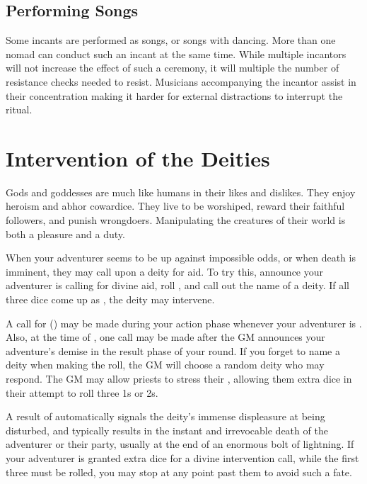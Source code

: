 \begin{multicols}{2}
\subsection{Performing Songs}
Some incants are performed as songs, or songs with dancing. More than one nomad can conduct such an incant at the same time. While multiple incantors will not increase the effect of such a ceremony, it will multiple the number of resistance checks needed to resist. Musicians accompanying the incantor assist in their concentration making it harder for external distractions to interrupt the ritual.

\section{Intervention of the Deities}
Gods and goddesses are much like humans in their likes and dislikes. They enjoy heroism and abhor cowardice. They live to be worshiped, reward their faithful followers, and punish wrongdoers. Manipulating the creatures of their world is both a pleasure and a duty.

When your adventurer seems to be up against impossible odds, or when death is imminent, they may call upon a deity for aid. To try this, announce your adventurer is calling for divine aid, roll , and call out the name of a deity. If all three dice come up as , the deity may intervene.

A call for  (\DI) may be made during your action phase whenever your adventurer is . Also, at the time of , one call may be made after the GM announces your adventure's demise in the result phase of your round. If you forget to name a deity when making the roll, the GM will choose a random deity who may respond. The GM may allow priests to stress their \CSE, allowing them extra dice in their attempt to roll three 1s or 2s.

A result of  automatically signals the deity's immense displeasure at being disturbed, and typically results in the instant and irrevocable death of the adventurer or their party, usually at the end of an enormous bolt of lightning. If your adventurer is granted extra dice for a divine intervention call, while the first three must be rolled, you may stop at any point past them to avoid such a fate.


\end{multicols}
